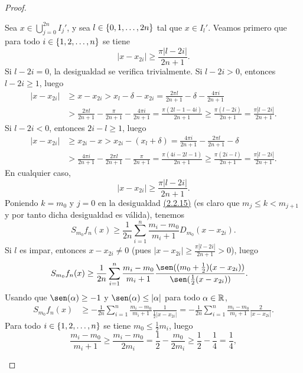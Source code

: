 \documentclass[a4paper, 12pt, oneside]{book}
\begin{document}
\begin{proof}
\begin{itemize}
        Sea $x \in \bigcup_{j=0}^{2n}I_j'$, y sea $l \in \{0,1,\mathellipsis,2n\}$ tal que $x \in I_l'$. Veamos primero que para todo $i \in \{1,2,\mathellipsis,n\}$ se tiene
        \[|x-x_{2i}| \geq \frac{\pi |l -2i|}{2n+1}.\]
        Si $l -2i = 0$, la desigualdad se verifica trivialmente. Si $l - 2i > 0$, entonces $l - 2i \geq 1$, luego
        \begin{align*}
            |x-x_{2i}| &\geq x-x_{2i} > x_l-\delta-x_{2i} = \frac{2\pi l}{2n+1}-\delta-\frac{4\pi i}{2n+1} \\ &> \frac{2\pi l}{2n+1}-\frac{\pi}{2n+1}-\frac{4\pi i}{2n+1}
            = \frac{\pi(2l-1-4i)}{2n+1} \geq \frac{\pi(l-2i)}{2n+1} = \frac{\pi|l-2i|}{2n+1}.
        \end{align*}
        Si $l - 2i < 0$, entonces $2i - l \geq 1$, luego
        \begin{align*}
            |x-x_{2i}| &\geq x_{2i}-x > x_{2i} - (x_l+\delta) = \frac{4\pi i}{2n+1} - \frac{2\pi l}{2n+1} - \delta \\ &>\frac{4\pi i}{2n+1} - \frac{2\pi l}{2n+1} -\frac{\pi}{2n+1}
            = \frac{\pi(4i-2l-1)}{2n+1} \geq \frac{\pi(2i-l)}{2n+1} = \frac{\pi|l-2i|}{2n+1}.
        \end{align*}
        En cualquier caso,
        \[|x-x_{2i}| \geq \frac{\pi |l -2i|}{2n+1}.\]
        Poniendo $k = m_0$ y $j = 0$ en la desigualdad \hyperref[2.2.15]{\color{blue}(2.2.15)} (es claro que $m_j \leq k < m_{j+1}$ y por tanto dicha desigualdad es válida), tenemos
        \[S_{m_0}f_n(x) \geq \frac{1}{2n}\sum_{i=1}^n \frac{m_i - m_0}{m_i + 1}D_{m_0}(x-x_{2i}).\]
        Si $l$ es impar, entonces $x-x_{2i} \neq 0$ (pues $|x-x_{2i}| \geq \frac{\pi |l-2i|}{2n+1} > 0$), luego
        \begin{align*}
            S_{m_0}f_n(x) &\geq \frac{1}{2n}\sum_{i=1}^n \frac{m_i-m_0}{m_i+1}\frac{\sen((m_0+\frac{1}{2})(x-x_{2i}))}{\sen(\frac{1}{2}(x-x_{2i}))}.
        \end{align*}
        Usando que $\sen(\alpha) \geq -1$ y $\sen(\alpha)\leq |\alpha|$ para todo $\alpha \in \mathbb R$,
        \begin{align*}
            S_{m_0}f_n(x) &\geq -\frac{1}{2n}\sum_{i=1}^n \frac{m_i-m_0}{m_i+1}\frac{1}{\frac{1}{2}|x-x_{2i}|} = -\frac{1}{2n}\sum_{i=1}^n \frac{m_i-m_0}{m_i+1}\frac{2}{|x-x_{2i}|} .
        \end{align*}
        Para todo $i \in \{1,2,\mathellipsis,n\}$ se tiene $m_0 \leq \frac{1}{2}m_i$, luego \[\frac{m_i-m_0}{m_i+1} \geq \frac{m_i-m_0}{2m_i} = \frac{1}{2}-\frac{m_0}{2m_i} \geq \frac{1}{2}-\frac{1}{4} = \frac{1}{4},\]

\end{itemize}
\end{proof}
\end{document}
